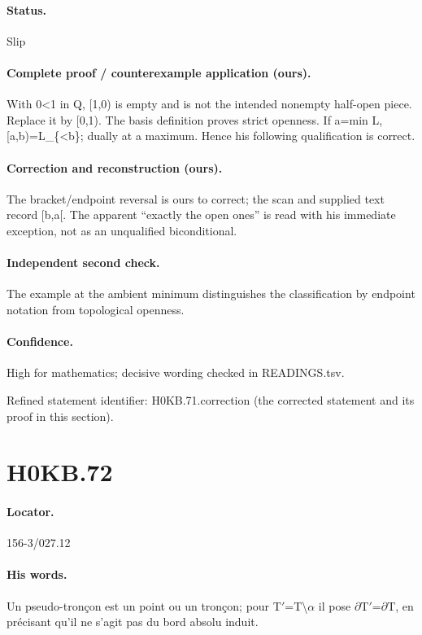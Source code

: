 \paragraph{Status.} Slip

\paragraph{Complete proof / counterexample application (ours).} With 0<1 in Q, [1,0) is empty and is not the intended nonempty half-open piece. Replace it by [0,1). The basis definition proves strict openness. If a=min L, [a,b)=L\_\{<b\}; dually at a maximum. Hence his following qualification is correct.

\paragraph{Correction and reconstruction (ours).} The bracket/endpoint reversal is ours to correct; the scan and supplied text record [b,a[. The apparent “exactly the open ones” is read with his immediate exception, not as an unqualified biconditional.

\paragraph{Independent second check.} The example at the ambient minimum distinguishes the classification by endpoint notation from topological openness.

\paragraph{Confidence.} High for mathematics; decisive wording checked in READINGS.tsv.

\noindent Refined statement identifier: H0KB.71.correction (the corrected statement and its proof in this section).

\section*{H0KB.72}\label{statement:H0KB.72}
\paragraph{Locator.} 156-3/027.12

\paragraph{His words.} Un pseudo-tronçon est un point ou un tronçon; pour T\ensuremath{\prime}=T\textbackslash{}\ensuremath{\alpha} il pose \ensuremath{\partial}T\ensuremath{\prime}=\ensuremath{\partial}T, en précisant qu’il ne s’agit pas du bord absolu induit.

